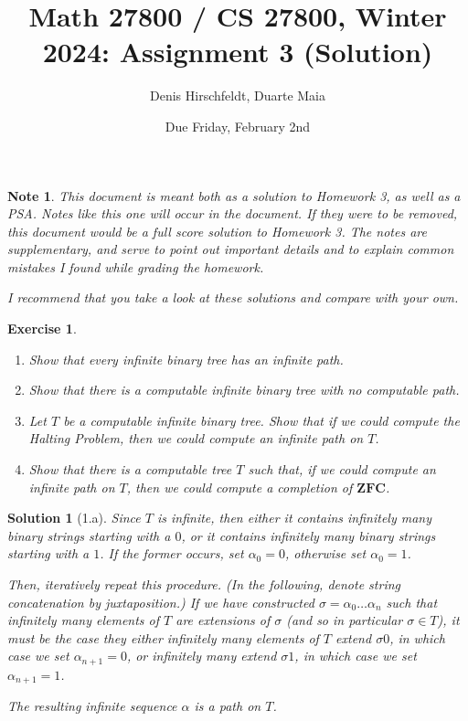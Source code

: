 \documentclass{article}
\title{Math 27800 / CS 27800, Winter 2024: Assignment 3 (Solution)}
\author{Denis Hirschfeldt, Duarte Maia}
\date{Due Friday, February 2nd}
\newtheorem{ex}{Exercise}
\theoremstyle{nonumberplain}
\newtheorem{sol}{Solution}
\newtheorem{note}{Note}
\newcommand{\ZFC}{\mathbf{ZFC}}
\begin{document}
\maketitle

\begin{note}
This document is meant both as a solution to Homework 3, as well as a PSA. Notes like this one will occur in the document. If they were to be removed, this document would be a full score solution to Homework 3. The notes are supplementary, and serve to point out important details and to explain common mistakes I found while grading the homework.

I recommend that you take a look at these solutions and compare with your own.
\end{note}

\begin{ex}
\leavevmode
\begin{enumerate}
\item Show that every infinite binary tree has an infinite path.
\item Show that there is a computable infinite binary tree with no computable path.
\item Let $T$ be a computable infinite binary tree. Show that if we could compute the Halting Problem, then we could compute an infinite path on $T$.
\item Show that there is a computable tree $T$ such that, if we could compute an infinite path on $T$, then we could compute a completion of $\ZFC$.
\end{enumerate}
\end{ex}

\begin{sol}[1.a]
Since $T$ is infinite, then either it contains infinitely many binary strings starting with a $0$, or it contains infinitely many binary strings starting with a $1$. If the former occurs, set $\alpha_0 = 0$, otherwise set $\alpha_0 = 1$.

Then, iteratively repeat this procedure. (In the following, denote string concatenation by juxtaposition.) If we have constructed $\sigma = \alpha_0 \dots \alpha_n$ such that infinitely many elements of $T$ are extensions of $\sigma$ (and so in particular $\sigma \in T$), it must be the case they either infinitely many elements of $T$ extend $\sigma0$, in which case we set $\alpha_{n+1} = 0$, or infinitely many extend $\sigma1$, in which case we set $\alpha_{n+1}=1$.

The resulting infinite sequence $\alpha$ is a path on $T$.
\end{sol}
\end{document}
